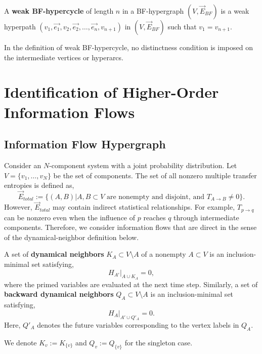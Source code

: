 \documentclass{comnet}%
\begin{document}
\begin{definition}
	A \textbf{weak BF-hypercycle} of length $n$ in a BF-hypergraph $(V, \overrightarrow{E}_{BF})$ is a weak hyperpath $(v_{1}, \overrightarrow{e_{1}}, v_{2}, \overrightarrow{e_{2}}, \dots, \overrightarrow{e_{n}}, v_{n+1})$ in $(V, \overrightarrow{E}_{BF})$ such that $v_{1} = v_{n+1}$.\\
\end{definition}
In the definition of weak BF-hypercycle, no distinctness condition is imposed on the intermediate vertices or hyperarcs.


\section{\label{sec:Identification}Identification of Higher-Order Information Flows}
\subsection{\label{sec:Identification_InfoHyper}Information Flow Hypergraph}
Consider an $N$-component system with a joint probability distribution. Let $V = \{ v_{1}, \dots, v_{N} \}$ be the set of components. The set of all nonzero multiple transfer entropies is defined as,
\begin{equation}
	\overrightarrow{E}_{total} := \{ (A, B) | A, B \subset V \text{ are nonempty and disjoint, and } T_{A \to B} \not= 0 \}. 
\end{equation}
However, $\overrightarrow{E}_{total}$ may contain indirect statistical relationships. For example, $T_{p \to q}$ can be nonzero even when the influence of $p$ reaches $q$ through intermediate components. Therefore, we consider information flows that are direct in the sense of the dynamical-neighbor definition below.\\

\begin{definition}
	A set of \textbf{dynamical neighbors} $K_{A} \subset V \setminus A$ of a nonempty $A \subset V$ is an inclusion-minimal set satisfying,
\begin{equation}
	 H_{A'}|_{A \cup K_{A}} = 0,
\end{equation}
where the primed variables are evaluated at the next time step. Similarly, a set of \textbf{backward dynamical neighbors} $Q_{A} \subset V \setminus A$ is an inclusion-minimal set satisfying,
\begin{equation}\label{eq:backward_neighbors}
 H_{A}|_{A' \cup Q'_{A}} = 0.
\end{equation}
Here, $Q'_{A}$ denotes the future variables corresponding to the vertex labels in $Q_{A}$.
\end{definition}
We denote $K_{v} := K_{\{v\}}$ and $Q_{v} := Q_{\{v\}}$ for the singleton case.\\
\end{document}
